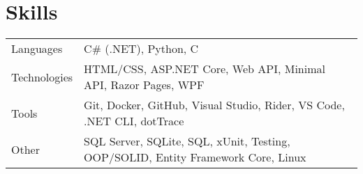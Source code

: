 \documentclass[a4paper,12pt]{article}
\begin{document}
\section{Skills}
\begin{tabularx}{\linewidth}{@{}l X@{}}
Languages &  \normalsize{C\# (.NET), Python, C  }\\
Technologies &  \normalsize{HTML/CSS, ASP.NET Core, Web API, Minimal API, Razor Pages, WPF  }\\
Tools &  \normalsize{Git, Docker, GitHub, Visual Studio, Rider, VS Code, .NET CLI, dotTrace  }\\
Other &  \normalsize{ SQL Server, SQLite, SQL, xUnit, Testing, OOP/SOLID, Entity Framework Core, Linux}\\
\end{tabularx}





\end{document}
